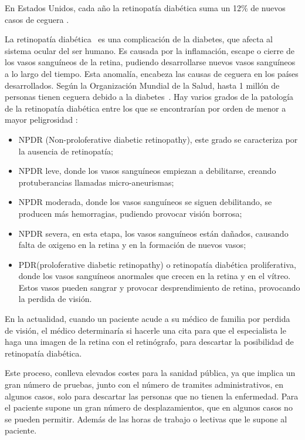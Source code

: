 En Estados Unidos, cada año la retinopatía diabética suma un 12\% de nuevos casos de ceguera \cite{porcentaje-afectados-eeuu}.

La retinopatía diabética~\cite{enfermedad-ocular-diabetica} es una complicación de la diabetes, que afecta al sistema ocular del ser humano. Es causada por la inflamación, escape o cierre de los vasos sanguíneos de la retina, pudiendo desarrollarse nuevos vasos sanguíneos a lo largo del tiempo. Esta anomalía, encabeza las causas de ceguera en los países desarrollados. Según la Organización Mundial de la Salud, hasta 1 millón de personas tienen ceguera debido a la diabetes~\cite{oms-diabetes}. 
Hay varios grados de la patología de la retinopatía diabética entre los que se encontrarían por orden de menor a mayor peligrosidad \cite{grados-retinopatia}: 
\begin{itemize}
    \item NPDR (Non-proloferative diabetic retinopathy), este grado se caracteriza por la ausencia de retinopatía;
    \item NPDR leve, donde los vasos sanguíneos empiezan a debilitarse, creando protuberancias llamadas micro-aneurismas;
    \item NPDR moderada, donde los vasos sanguíneos se siguen debilitando, se producen más hemorragias, pudiendo provocar visión borrosa;
    \item NPDR severa, en esta etapa, los vasos sanguíneos están dañados, causando falta de oxigeno en la retina y en la formación de nuevos vasos;
    \item PDR(proloferative diabetic retinopathy) o retinopatía diabética proliferativa, donde los vasos sanguíneos anormales que crecen en la retina y en el vítreo. Estos vasos pueden sangrar y provocar desprendimiento de retina, provocando la perdida de visión.
\end{itemize} 


En la actualidad, cuando un paciente acude a su médico de familia por perdida de visión, el médico determinaría si hacerle una cita para que el especialista le haga una imagen de la retina con el retinógrafo, para descartar la posibilidad de retinopatía diabética.

Este proceso, conlleva elevados costes para la sanidad pública, ya que implica un gran número de pruebas, junto con el número de tramites administrativos, en algunos casos, solo para descartar las personas que no tienen la enfermedad. Para el paciente supone un gran número de desplazamientos, que en algunos casos no se pueden permitir. Además de las horas de trabajo o lectivas que le supone al paciente.

